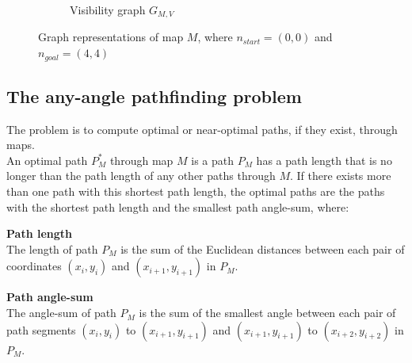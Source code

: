 \documentclass[12pt,notitlepage]{report}
\begin{document}
\begin{figure}[h]
\begin{subfigure}{.5\textwidth}
    \caption{Visibility graph $G_{M,V}$}
  \end{subfigure}
  \caption[Graph representations of map $M$]{Graph representations of map $M$, where $n_{start} = (0,0)$ and $n_{goal} = (4,4)$}
\end{figure}

\newpage
\subsection{The any-angle pathfinding problem}

The problem is to compute optimal or near-optimal paths, if they exist, through maps.\\

\noindent
{}
An optimal path $P^{*}_{M}$ through map $M$ is a path $P_{M}$ has a path length that is no longer than the path length of any other paths through $M$. If there exists more than one path with this shortest path length, the optimal paths are the paths with the shortest path length and the smallest path angle-sum, where:

\begin{description}
\item{\bfseries Path length}\\
The length of path $P_{M}$ is the sum of the Euclidean distances between each pair of coordinates $(x_{i},y_{i})$ and $(x_{i+1},y_{i+1})$ in $P_{M}$.
\item{\bfseries Path angle-sum}\\
The angle-sum of path $P_{M}$ is the sum of the smallest angle between each pair of path segments $(x_{i},y_{i})$ to $(x_{i+1},y_{i+1})$ and $(x_{i+1},y_{i+1})$ to $(x_{i+2},y_{i+2})$ in $P_{M}$.
\end{description}
\end{document}
